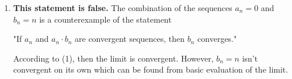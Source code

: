 \documentclass{article}
\begin{document}
\begin{enumerate}[label=\textbf{(9.\arabic*)}]
\begin{enumerate}
\item \textbf{This statement is false.} The combination of the sequences $a_n=0$ and $b_n=n$ is a counterexample of the statement
\begin{center}
"If ${a_n}$ and ${a_n\cdot b_n}$ are convergent sequences, then ${b_n}$ converges."
\end{center}
According to (1), then the limit is convergent. However, $b_n=n$ isn't convergent on its own which can be found from basic evaluation of the limit.  
\end{enumerate}

\end{enumerate}
\end{document}
